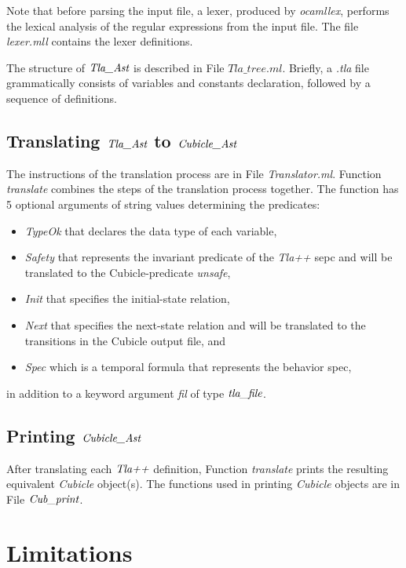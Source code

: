 \documentclass{article}
\begin{document}
Note that before parsing the input file, a lexer, produced by \textit{ocamllex}, performs the lexical analysis of the regular expressions from the input file. The file \textit{lexer.mll} contains  the lexer definitions. 


The structure of $\emph{Tla\_Ast}$ is described in File  $\textit{Tla\_tree.ml}$. Briefly, a \textit{.tla} file  grammatically  consists of variables and constants declaration, followed by a sequence of definitions. 


\subsection*{ Translating $\emph{Tla\_Ast}$ to $\emph{Cubicle\_Ast}$ }
The instructions of the translation process are in File \emph{Translator.ml}. Function \emph{translate} combines the steps of the translation process together. The function has 5 optional arguments of string values determining the predicates:  

\begin{itemize}
\item \emph{TypeOk} that declares the data type of each variable, 
\item \emph{Safety}  that represents the invariant predicate of the \emph{Tla++} sepc and will be translated to the  Cubicle-predicate \emph{unsafe}, 
\item \emph{Init} that specifies the initial-state relation,
\item \emph{Next} that specifies the next-state relation and will be translated to the transitions in the Cubicle output file, and
\item \emph{Spec} which is a temporal formula that represents the behavior spec,
\end{itemize}
in addition to a keyword argument \emph{fil} of type $\emph{tla\_file}$.   

\subsection*{ Printing $\emph{Cubicle\_Ast}$ }
After translating each $\emph{Tla++}$ definition, Function \emph{translate} prints the resulting equivalent \emph{Cubicle} object(s). The functions used in printing \emph{Cubicle} objects are in File $\emph{Cub\_print}$.


\section*{Limitations}
\end{document}
